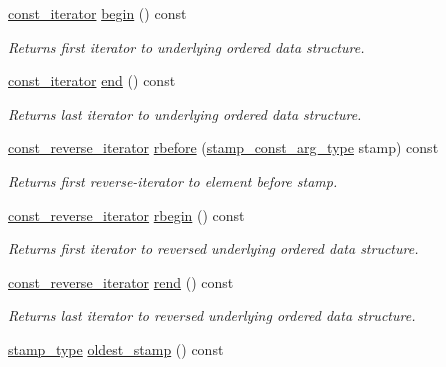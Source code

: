 \begin{DoxyCompactItemize}
\hyperlink{classflow_1_1_dispatch_queue_a307496fdc34a2d59e11114dabf85dc8a}{const\+\_\+iterator} \hyperlink{classflow_1_1_dispatch_queue_a19612c628308b97497ffca62c9b2b420}{begin} () const
\begin{DoxyCompactList}\small\item\em Returns first iterator to underlying ordered data structure. \end{DoxyCompactList}\item 
\hyperlink{classflow_1_1_dispatch_queue_a307496fdc34a2d59e11114dabf85dc8a}{const\+\_\+iterator} \hyperlink{classflow_1_1_dispatch_queue_a359b294ce203e10ee9fafc147f6638ff}{end} () const
\begin{DoxyCompactList}\small\item\em Returns last iterator to underlying ordered data structure. \end{DoxyCompactList}\item 
\hyperlink{classflow_1_1_dispatch_queue_ac74f1a9a8d77b06e9576492df2a50e4f}{const\+\_\+reverse\+\_\+iterator} \hyperlink{classflow_1_1_dispatch_queue_a39b906c46d56d32cda2bc1b61f6dcc32}{rbefore} (\hyperlink{classflow_1_1_dispatch_queue_affc83531dc53ee147899a33e82a6cbf0}{stamp\+\_\+const\+\_\+arg\+\_\+type} stamp) const
\begin{DoxyCompactList}\small\item\em Returns first reverse-\/iterator to element before stamp. \end{DoxyCompactList}\item 
\hyperlink{classflow_1_1_dispatch_queue_ac74f1a9a8d77b06e9576492df2a50e4f}{const\+\_\+reverse\+\_\+iterator} \hyperlink{classflow_1_1_dispatch_queue_a969fdabec571725b903056d69ea2a31b}{rbegin} () const
\begin{DoxyCompactList}\small\item\em Returns first iterator to reversed underlying ordered data structure. \end{DoxyCompactList}\item 
\hyperlink{classflow_1_1_dispatch_queue_ac74f1a9a8d77b06e9576492df2a50e4f}{const\+\_\+reverse\+\_\+iterator} \hyperlink{classflow_1_1_dispatch_queue_a5fee6900da4ddd095b78608081b1873d}{rend} () const
\begin{DoxyCompactList}\small\item\em Returns last iterator to reversed underlying ordered data structure. \end{DoxyCompactList}\item 
\hyperlink{classflow_1_1_dispatch_queue_a7908f3d78b7f1767462244b94434d748}{stamp\+\_\+type} \hyperlink{classflow_1_1_dispatch_queue_a6411ccf159a54568dc00072b35593189}{oldest\+\_\+stamp} () const

\end{DoxyCompactItemize}

